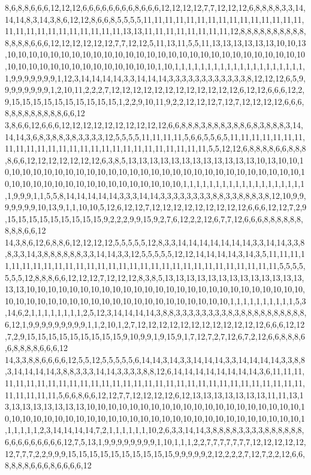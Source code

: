 8,6,8,8,6,6,6,12,12,12,6,6,6,6,6,6,6,6,8,6,6,6,12,12,12,12,7,7,12,12,12,6,8,8,8,8,3,3,14,14,14,8,3,14,3,8,6,12,12,8,6,6,8,5,5,5,5,11,11,11,11,11,11,11,11,11,11,11,11,11,11,11,11,11,11,11,11,11,11,11,11,11,11,13,13,11,11,11,11,11,11,11,11,12,8,8,8,8,8,8,8,8,8,8,8,8,8,8,6,6,6,12,12,12,12,12,12,7,7,12,12,5,11,13,11,5,5,11,13,13,13,13,13,13,10,10,13,10,10,10,10,10,10,10,10,10,10,10,10,10,10,10,10,10,10,10,10,10,10,10,10,10,10,10,10,10,10,10,10,10,10,10,10,10,10,10,10,10,10,1,10,1,1,1,1,1,1,1,1,1,1,1,1,1,1,1,1,1,1,1,1,1,9,9,9,9,9,9,9,1,12,3,14,14,14,14,3,3,14,14,14,3,3,3,3,3,3,3,3,3,3,3,3,8,12,12,12,6,5,9,9,9,9,9,9,9,9,1,2,10,11,2,2,2,7,12,12,12,12,12,12,12,12,12,12,12,12,6,12,12,6,6,6,12,2,9,15,15,15,15,15,15,15,15,15,15,1,2,2,9,10,11,9,2,2,12,12,12,7,12,7,12,12,12,12,6,6,6,8,8,8,8,8,8,8,8,8,6,6,12
3,8,6,6,12,6,6,6,12,12,12,12,12,12,12,12,12,12,6,6,8,8,8,3,8,8,8,3,8,8,6,8,3,8,8,8,3,14,14,14,3,6,8,3,8,8,3,8,3,3,3,3,12,5,5,5,5,11,11,11,11,5,6,6,5,5,6,5,11,11,11,11,11,11,11,11,11,11,11,11,11,11,11,11,11,11,11,11,11,11,11,11,11,11,5,5,12,12,6,8,8,8,8,6,6,8,8,8,8,6,6,12,12,12,12,12,12,12,6,3,8,5,13,13,13,13,13,13,13,13,13,13,13,13,10,13,10,10,10,10,10,10,10,10,10,10,10,10,10,10,10,10,10,10,10,10,10,10,10,10,10,10,10,10,10,10,10,10,10,10,10,10,10,10,10,10,10,10,10,10,10,10,10,1,1,1,1,1,1,1,1,1,1,1,1,1,1,1,1,1,1,1,1,9,9,9,1,1,5,5,8,14,14,14,14,14,3,3,3,14,14,3,3,3,3,3,3,3,3,8,8,3,3,8,8,8,3,8,12,10,9,9,9,9,9,9,9,10,13,9,1,1,10,10,5,12,6,12,12,7,12,12,12,12,12,12,12,12,12,6,6,6,12,12,7,2,9,15,15,15,15,15,15,15,15,15,9,2,2,2,9,9,15,9,2,7,6,12,2,2,12,6,7,7,12,6,6,6,8,8,8,8,8,8,8,8,8,6,6,12
14,3,8,6,12,6,8,8,6,12,12,12,12,5,5,5,5,5,12,8,3,3,14,14,14,14,14,14,14,3,3,14,14,3,3,8,8,3,3,14,3,8,8,8,8,8,8,3,3,14,14,3,3,12,5,5,5,5,5,12,12,14,14,14,14,3,14,3,5,11,11,11,11,11,11,11,11,11,11,11,11,11,11,11,11,11,11,11,11,11,11,11,11,11,11,11,11,11,5,5,5,5,5,5,5,12,8,8,8,6,6,12,12,12,7,12,12,12,8,3,8,5,13,13,13,13,13,13,13,13,13,13,13,13,13,13,13,10,10,10,10,10,10,10,10,10,10,10,10,10,10,10,10,10,10,10,10,10,10,10,10,10,10,10,10,10,10,10,10,10,10,10,10,10,10,10,10,10,10,10,10,10,10,10,1,1,1,1,1,1,1,1,1,1,5,3,14,6,2,1,1,1,1,1,1,1,1,2,5,12,3,14,14,14,14,3,8,8,3,3,3,3,3,3,3,3,8,3,8,8,8,8,8,8,8,8,8,8,6,12,1,9,9,9,9,9,9,9,9,9,1,1,2,10,1,2,7,12,12,12,12,12,12,12,12,12,12,12,12,6,6,6,12,12,7,2,9,15,15,15,15,15,15,15,15,15,9,10,9,9,1,9,15,9,1,7,12,7,2,7,12,6,7,2,12,6,6,8,8,8,6,6,8,8,8,8,6,6,6,12
14,3,3,8,8,6,6,6,6,12,5,5,12,5,5,5,5,5,6,14,14,3,14,3,3,14,14,14,3,3,14,14,14,14,3,3,8,8,3,14,14,14,14,3,8,8,3,3,3,14,14,3,3,3,3,8,8,12,6,14,14,14,14,14,14,14,14,3,6,11,11,11,11,11,11,11,11,11,11,11,11,11,11,11,11,11,11,11,11,11,11,11,11,11,11,11,11,11,11,11,11,11,11,11,11,5,6,6,8,6,6,12,12,7,7,12,12,12,12,6,12,13,13,13,13,13,13,13,11,11,13,13,13,13,13,13,13,13,13,10,10,10,10,10,10,10,10,10,10,10,10,10,10,10,10,10,10,10,10,10,10,10,10,10,10,10,10,10,10,10,10,10,10,10,10,10,10,10,10,10,10,10,10,10,10,10,10,1,1,1,1,1,1,2,3,14,14,14,14,7,2,1,1,1,1,1,1,10,2,6,3,3,14,14,3,8,8,8,8,3,3,3,3,8,8,8,8,8,8,6,6,6,6,6,6,6,6,6,12,7,5,13,1,9,9,9,9,9,9,9,9,1,10,1,1,1,2,2,7,7,7,7,7,7,7,12,12,12,12,12,12,7,7,7,2,2,9,9,9,15,15,15,15,15,15,15,15,15,15,9,9,9,9,9,2,12,2,2,2,7,12,7,2,2,12,6,6,8,8,8,8,6,6,6,8,6,6,6,6,12
